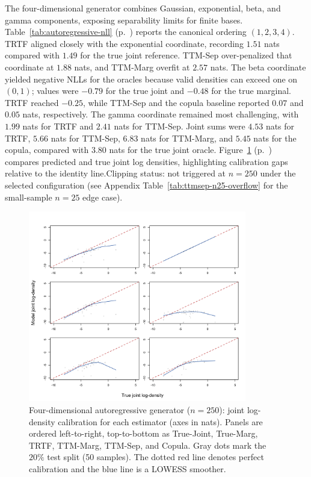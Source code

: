 \documentclass[11pt,a4paper,twoside]{book}\usepackage[]{graphicx}\usepackage[]{xcolor}
\begin{document}
The four-dimensional generator combines Gaussian, exponential, beta, and gamma components, exposing separability limits for finite bases. Table~\ref{tab:autoregressive-nll} (p.~\pageref{tab:autoregressive-nll}) reports the canonical ordering $(1,2,3,4)$. TRTF aligned closely with the exponential coordinate, recording $1.51$ nats compared with $1.49$ for the true joint reference. TTM-Sep over-penalized that coordinate at $1.88$ nats, and TTM-Marg overfit at $2.57$ nats. The beta coordinate yielded negative NLLs for the oracles because valid densities can exceed one on $(0,1)$; values were $-0.79$ for the true joint and $-0.48$ for the true marginal. TRTF reached $-0.25$, while TTM-Sep and the copula baseline reported $0.07$ and $0.05$ nats, respectively. The gamma coordinate remained most challenging, with $1.99$ nats for TRTF and $2.41$ nats for TTM-Sep. Joint sums were $4.53$ nats for TRTF, $5.66$ nats for TTM-Sep, $6.83$ nats for TTM-Marg, and $5.45$ nats for the copula, compared with $3.80$ nats for the true joint oracle. Figure~\ref{fig:autoregressive-joint-calibration} (p.~\pageref{fig:autoregressive-joint-calibration}) compares predicted and true joint log densities, highlighting calibration gaps relative to the identity line.\;Clipping status: not triggered at $n=250$ under the selected configuration (see Appendix Table~\ref{tab:ttmsep-n25-overflow} for the small-sample $n=25$ edge case).

\begin{figure}[htbp]
  \centering
  \includegraphics[width=0.85\textwidth]{figure/logdensity_joint_N250.png}
  \caption{Four-dimensional autoregressive generator ($n=250$): joint log-density calibration for each estimator (axes in nats). Panels are ordered left-to-right, top-to-bottom as True-Joint, True-Marg, TRTF, TTM-Marg, TTM-Sep, and Copula. Gray dots mark the $20\%$ test split (50 samples). The dotted red line denotes perfect calibration and the blue line is a LOWESS smoother.}
  \label{fig:autoregressive-joint-calibration}
\end{figure}
\end{document}
